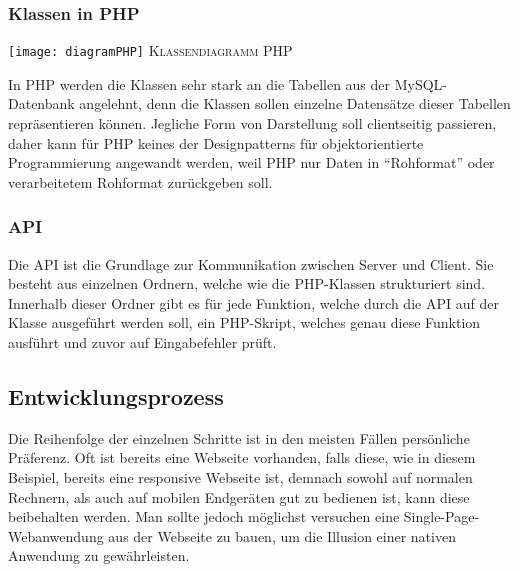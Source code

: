 \documentclass[a4paper,12pt,ngerman,listof=numbered]{scrartcl}      %
\let\oldcite\cite
\renewcommand{\cite}[1]{\textsuperscript{\oldcite{#1}}}
\begin{document}
	\subsubsection{Klassen in PHP}
	{
		\centering
		\texttt{[image: diagramPHP]}
		\textsc{Klassendiagramm PHP}\par
	}
	In PHP werden die Klassen sehr stark an die Tabellen aus der MySQL-Datenbank angelehnt, denn die Klassen sollen einzelne Datensätze dieser Tabellen repräsentieren können. Jegliche Form von Darstellung soll clientseitig passieren, daher kann für PHP keines der Designpatterns für objektorientierte Programmierung angewandt werden, weil PHP nur Daten in ``Rohformat'' oder verarbeitetem Rohformat zurückgeben soll.\par
	
	\subsubsection{API}
	Die API ist die Grundlage zur Kommunikation zwischen Server und Client. Sie besteht aus einzelnen Ordnern, welche wie die PHP-Klassen strukturiert sind. Innerhalb dieser Ordner gibt es für jede Funktion, welche durch die API auf der Klasse ausgeführt werden soll, ein PHP-Skript, welches genau diese Funktion ausführt und zuvor auf Eingabefehler prüft.\par
	
	\newpage
	\subsection{Entwicklungsprozess}
	Die Reihenfolge der einzelnen Schritte ist in den meisten Fällen persönliche Präferenz. Oft ist bereits eine Webseite vorhanden, falls diese, wie in diesem Beispiel, bereits eine responsive Webseite ist, demnach sowohl auf normalen Rechnern, als auch auf mobilen Endgeräten gut zu bedienen ist, kann diese beibehalten werden. Man sollte jedoch möglichst versuchen eine Single-Page-Webanwendung\cite{singlePageWiki} aus der Webseite zu bauen, um die Illusion einer nativen Anwendung zu gewährleisten.\par
	
\end{document}

